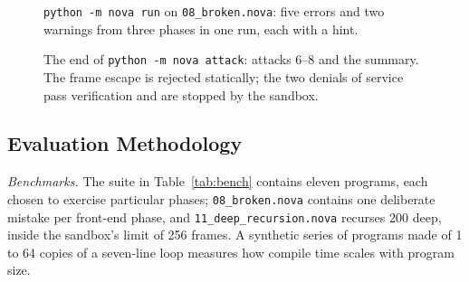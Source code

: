 \documentclass[conference]{IEEEtran}
\newcommand{\code}[1]{\texttt{#1}}
\begin{document}
\begin{figure}[!tbp]

\caption{\code{python -m nova run} on \code{08\_broken.nova}: five errors and two warnings from three phases in one run, each with a hint.}
\label{fig:clibroken}
\end{figure}

\begin{figure}[!tbp]

\caption{The end of \code{python -m nova attack}: attacks 6--8 and the summary. The frame escape is rejected statically; the two denials of service pass verification and are stopped by the sandbox.}
\label{fig:cliattack}
\end{figure}

\subsection{Evaluation Methodology}
\label{sec:evalmethod}
\emph{Benchmarks.} The suite in Table~\ref{tab:bench} contains eleven programs, each chosen to exercise particular phases; \code{08\_broken.nova} contains one deliberate mistake per front-end phase, and \code{11\_deep\_recursion.nova} recurses 200 deep, inside the sandbox's limit of 256 frames. A synthetic series of programs made of 1 to 64 copies of a seven-line loop measures how compile time scales with program size.
\end{document}
